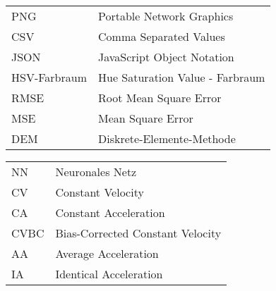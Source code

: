 	\begin{tabular}{ll}
		PNG		& Portable Network Graphics \\
		CSV		& Comma Separated Values \\
		JSON	& JavaScript Object Notation \\
		HSV-Farbraum		& Hue Saturation Value - Farbraum  \\
		RMSE	& Root Mean Square Error \\
		MSE		& Mean Square Error \\
		DEM 	& Diskrete-Elemente-Methode	\\
	\end{tabular}

	\begin{tabular}{ll}
		NN		& Neuronales Netz \\
		CV		& Constant Velocity \\
		CA		& Constant Acceleration  \\
		CVBC	& Bias-Corrected Constant Velocity \\
		AA		& Average Acceleration \\
		IA 		& Identical Acceleration	\\
	\end{tabular}



